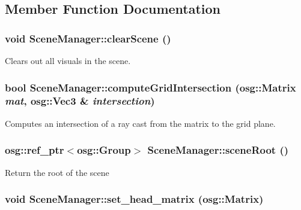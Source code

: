 \subsection{Member Function Documentation}
\hypertarget{class_scene_manager_ad6525bc44ad7ce3cd05f8569806cc826}{
\subsubsection[{clearScene}]{\setlength{\rightskip}{0pt plus 5cm}void SceneManager::clearScene ()}}
\label{class_scene_manager_ad6525bc44ad7ce3cd05f8569806cc826}
Clears out all visuals in the scene. \hypertarget{class_scene_manager_a4bc5637a92002e8152964bde00eef4bc}{
\subsubsection[{computeGridIntersection}]{\setlength{\rightskip}{0pt plus 5cm}bool SceneManager::computeGridIntersection (osg::Matrix {\em mat}, \/  osg::Vec3 \& {\em intersection})}}
\label{class_scene_manager_a4bc5637a92002e8152964bde00eef4bc}
Computes an intersection of a ray cast from the matrix to the grid plane. \hypertarget{class_scene_manager_a7e94d848584c338244f3be28964de339}{
\subsubsection[{sceneRoot}]{\setlength{\rightskip}{0pt plus 5cm}osg::ref\_\-ptr$<$osg::Group$>$ SceneManager::sceneRoot ()}}
\label{class_scene_manager_a7e94d848584c338244f3be28964de339}
Return the root of the scene \hypertarget{class_scene_manager_a7e94ed11f1b76b95189c13cdf70a4e6b}{
\subsubsection[{set\_\-head\_\-matrix}]{\setlength{\rightskip}{0pt plus 5cm}void SceneManager::set\_\-head\_\-matrix (osg::Matrix)}}
